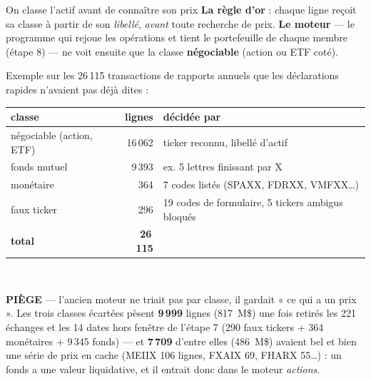 \documentclass[11pt,aspectratio=169]{beamer}
\newcommand{\defl}[1]{{\scriptsize\color{black!55}#1}}
\newcommand{\piege}[1]{%
  \colorbox{warnorange!12}{\parbox{\dimexpr\linewidth-8pt}{\scriptsize
    \textbf{\textcolor{warnorange}{PIÈGE}}\; --- #1}}}
\begin{document}
\begin{frame}{On classe l'actif avant de connaître son prix}
  \footnotesize
  \textbf{La règle d'or} : chaque ligne reçoit sa classe à partir de son \emph{libellé},
  \emph{avant} toute recherche de prix. \textbf{Le moteur} --- le programme qui rejoue les opérations
  et tient le portefeuille de chaque membre (étape 8) --- ne voit ensuite que la classe
  \textbf{négociable} (action ou ETF coté).
  \medskip

  \centering
  Exemple sur les 26\,115 transactions de rapports annuels que les déclarations rapides
  n'avaient pas déjà dites :\\[1.5mm]
  \begin{tabular}{l r l}
    \toprule
    classe & lignes & décidée par \\
    \midrule
    négociable \defl{(action, ETF)} & 16\,062 & \defl{ticker reconnu, libellé d'actif} \\
    fonds mutuel                    & 9\,393  & \defl{ex. 5 lettres finissant par X} \\
    monétaire                       & 364    & \defl{7 codes listés (SPAXX, FDRXX, VMFXX\ldots)} \\
    faux ticker                     & 296    & \defl{19 codes de formulaire, 5 tickers ambigus bloqués} \\
    \midrule
    \textbf{total} & \textbf{26\,115} & \\
    \bottomrule
  \end{tabular}\\[2mm]

  \raggedright
  \piege{l'ancien moteur ne triait pas par classe, il gardait « ce qui a un prix ».
    Les trois classes écartées pèsent \textbf{9\,999} lignes (817~M\$) une fois retirés les
    221 échanges et les 14 dates hors fenêtre de l'étape 7 (290 faux tickers + 364 monétaires
    + 9\,345 fonds) --- et \textbf{7\,709} d'entre elles (486~M\$) avaient bel et bien une série de
    prix en cache (MEIIX 106 lignes, FXAIX 69, FHARX 55\ldots) : un fonds a une valeur liquidative,
    et il entrait donc dans le moteur \emph{actions}.}
\end{frame}
\end{document}
